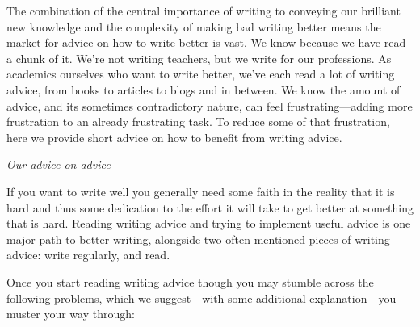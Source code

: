 \documentclass[11pt,letter]{article}
\begin{document}
The combination of the central importance of writing to conveying our brilliant new knowledge and the complexity of making bad writing better means the market for advice on how to write better is vast. We know because we have read a chunk of it. We’re not writing teachers, but we write for our professions. As academics ourselves who want to write better, we've each read a lot of writing advice, from books to articles to blogs and in between. We know the amount of advice, and its sometimes contradictory nature, can feel frustrating---adding more frustration to an already frustrating task. To reduce some of that frustration, here we provide short advice on how to benefit from writing advice. 

\emph{Our advice on advice}

If you want to write well you generally need some faith in the reality that it is hard and thus some dedication to the effort it will take to get better at something that is hard. Reading writing advice and trying to implement useful advice is one major path to better writing, alongside two often mentioned pieces of writing advice: write regularly, and read. 

Once you start reading writing advice though you may stumble across the following problems, which we suggest---with some additional explanation---you muster your way through:
\end{document}
